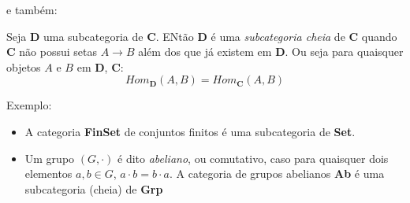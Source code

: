 \documentclass[../main.tex]{subfiles}
\begin{document}
e também:

\begin{definition}
    Seja $\textbf{D}$ uma subcategoria de $\textbf{C}$. ENtão $\textbf{D}$ é uma \emph{subcategoria cheia} de \textbf{C} quando \textbf{C} não possui setas $A \to B$ além dos que já existem em $\textbf{D}$. Ou seja para quaisquer objetos $A$ e $B$ em $\textbf{D}$, $\textbf{C}$: $$Hom_{\textbf{D}}(A, B) = Hom_{\textbf{C}}(A, B)$$
\end{definition}

Exemplo:

\begin{itemize}
    \item A categoria \textbf{FinSet} de conjuntos finitos é uma subcategoria de \textbf{Set}.
    \item Um grupo $(G, \cdot)$ é dito \emph{abeliano}, ou comutativo, caso para quaisquer dois elementos $a, b \in G$, $a \cdot b = b \cdot a$. A categoria de grupos abelianos \textbf{Ab} é uma subcategoria (cheia) de \textbf{Grp}
\end{itemize}
\end{document}
